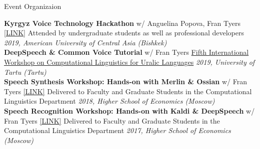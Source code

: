 \documentclass{resume} %
\begin{document}
\begin{minipage}{\textwidth}
\begin{rSection}{Event Organizaion}
\vspace{.25cm}

  {\bf Kyrgyz Voice Technology Hackathon} {w/ Anguelina Popova, Fran Tyers} {\href{https://jrmeyer.github.io/kyrgyz-voice-hackathon/}{[LINK]}} {Attended by undergraduate students as well as professional developers} \hfill {\em 2019, American University of Central Asia (Bishkek)} \\
  
  {\bf DeepSpeech \& Common Voice Tutorial} {w/ Fran Tyers}  {} { \href{https://sisu.ut.ee/iwclul2019/avaleht}{Fifth International Workshop on Computational Linguistics for Uralic Languages} } \hfill {\em 2019, University of Tartu (Tartu)} \\

  {\bf Speech Synthesis Workshop: Hands-on with Merlin \& Ossian} {w/ Fran Tyers} {\href{http://jrmeyer.github.io/tts/2016/12/09/tts-workshop.html}{[LINK]}} {Delivered to Faculty and Graduate Students in the Computational Linguistics Department} \hfill {\em 2018, Higher School of Economics (Moscow)} \\

  {\bf Speech Recognition Workshop: Hands-on with Kaldi \& DeepSpeech} {w/ Fran Tyers}  {\href{http://jrmeyer.github.io/misc/stt-vishka.pdf}{[LINK]}} {Delivered to Faculty and Graduate Students in the Computational Linguistics Department} \hfill {\em 2017, Higher School of Economics (Moscow)} \\

\end{rSection}
\end{minipage}





\end{document}
